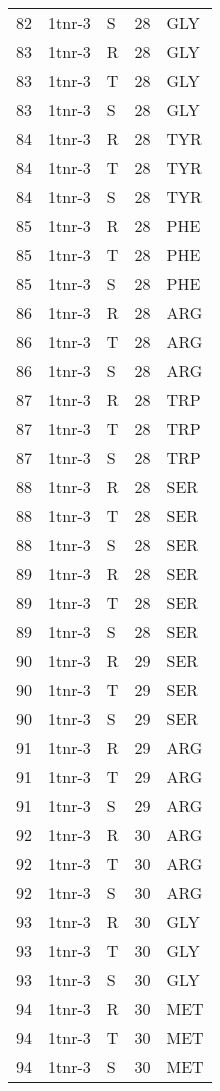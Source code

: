 \begin{tiny}
\begin{longtable}[l]{l|l|l|l|l}
	82 & 1tnr-3 & S & 28 & GLY \\
	83 & 1tnr-3 & R & 28 & GLY \\
	83 & 1tnr-3 & T & 28 & GLY \\
	83 & 1tnr-3 & S & 28 & GLY \\
	84 & 1tnr-3 & R & 28 & TYR \\
	84 & 1tnr-3 & T & 28 & TYR \\
	84 & 1tnr-3 & S & 28 & TYR \\
	85 & 1tnr-3 & R & 28 & PHE \\
	85 & 1tnr-3 & T & 28 & PHE \\
	85 & 1tnr-3 & S & 28 & PHE \\
	86 & 1tnr-3 & R & 28 & ARG \\
	86 & 1tnr-3 & T & 28 & ARG \\
	86 & 1tnr-3 & S & 28 & ARG \\
	87 & 1tnr-3 & R & 28 & TRP \\
	87 & 1tnr-3 & T & 28 & TRP \\
	87 & 1tnr-3 & S & 28 & TRP \\
	88 & 1tnr-3 & R & 28 & SER \\
	88 & 1tnr-3 & T & 28 & SER \\
	88 & 1tnr-3 & S & 28 & SER \\
	89 & 1tnr-3 & R & 28 & SER \\
	89 & 1tnr-3 & T & 28 & SER \\
	89 & 1tnr-3 & S & 28 & SER \\
	90 & 1tnr-3 & R & 29 & SER \\
	90 & 1tnr-3 & T & 29 & SER \\
	90 & 1tnr-3 & S & 29 & SER \\
	91 & 1tnr-3 & R & 29 & ARG \\
	91 & 1tnr-3 & T & 29 & ARG \\
	91 & 1tnr-3 & S & 29 & ARG \\
	92 & 1tnr-3 & R & 30 & ARG \\
	92 & 1tnr-3 & T & 30 & ARG \\
	92 & 1tnr-3 & S & 30 & ARG \\
	93 & 1tnr-3 & R & 30 & GLY \\
	93 & 1tnr-3 & T & 30 & GLY \\
	93 & 1tnr-3 & S & 30 & GLY \\
	94 & 1tnr-3 & R & 30 & MET \\
	94 & 1tnr-3 & T & 30 & MET \\
	94 & 1tnr-3 & S & 30 & MET \\

\end{longtable}
\end{tiny}
